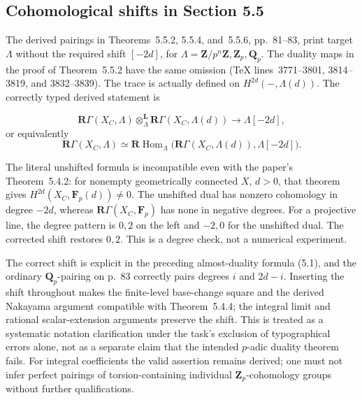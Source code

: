 \documentclass[10pt]{article}
\begin{document}
\subsection*{Cohomological shifts in Section 5.5}
The derived pairings in Theorems 5.5.2, 5.5.4, and 5.5.6, pp. 81–83, print target \(\Lambda\) without the required shift \([-2d]\), for \(\Lambda=\mathbf Z/p^n\mathbf Z,\mathbf Z_p,\mathbf Q_p\). The duality maps in the proof of Theorem 5.5.2 have the same omission (TeX lines 3771–3801, 3814–3819, and 3832–3839). The trace is actually defined on \(H^{2d}(-,\Lambda(d))\). The correctly typed derived statement is\par
\[\mathbf R\Gamma(X_C,\Lambda)\otimes_\Lambda^{\mathbf L}
\mathbf R\Gamma(X_C,\Lambda(d))\longrightarrow\Lambda[-2d],\] or equivalently \[\mathbf R\Gamma(X_C,\Lambda)\simeq
\mathbf R\operatorname{Hom}_\Lambda\big(\mathbf R\Gamma(X_C,\Lambda(d)),\Lambda[-2d]\big).\]\par
The literal unshifted formula is incompatible even with the paper’s Theorem 5.4.2: for nonempty geometrically connected \(X\), \(d>0\), that theorem gives \(H^{2d}(X_C,\mathbf F_p(d))\ne0\). The unshifted dual has nonzero cohomology in degree \(-2d\), whereas \(\mathbf R\Gamma(X_C,\mathbf F_p)\) has none in negative degrees. For a projective line, the degree pattern is \(0,2\) on the left and \(-2,0\) for the unshifted dual. The corrected shift restores \(0,2\). This is a degree check, not a numerical experiment.\par
The correct shift is explicit in the preceding almost-duality formula (5.1), and the ordinary \(\mathbf Q_p\)-pairing on p. 83 correctly pairs degrees \(i\) and \(2d-i\). Inserting the shift throughout makes the finite-level base-change square and the derived Nakayama argument compatible with Theorem 5.4.4; the integral limit and rational scalar-extension arguments preserve the shift. This is treated as a systematic notation clarification under the task’s exclusion of typographical errors alone, not as a separate claim that the intended \(p\)-adic duality theorem fails. For integral coefficients the valid assertion remains derived; one must not infer perfect pairings of torsion-containing individual \(\mathbf Z_p\)-cohomology groups without further qualifications.\par
\end{document}
